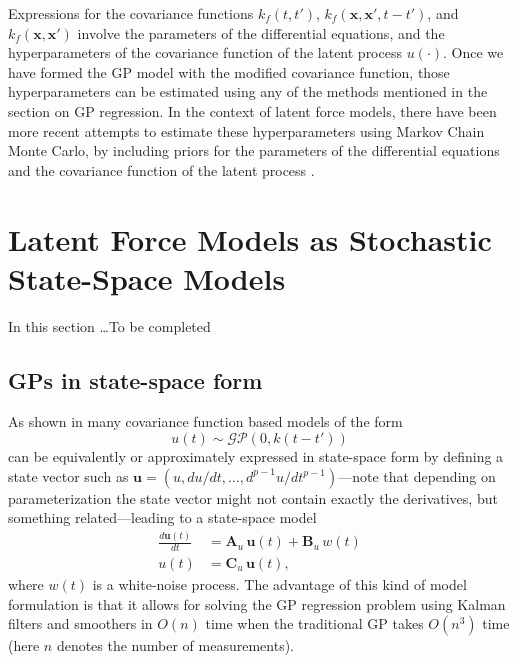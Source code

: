 \documentclass[journal]{IEEEtran}
\newcommand{\simo}[1]{{\color{red}#1}}
\begin{document}

Expressions for the covariance functions $k_{f}(t,t')$,
$k_{f}(\mathbf{x}, \mathbf{x}', t-t')$, and $k_{f}(\mathbf{x}, \mathbf{x}')$ involve the parameters of the differential equations, and the hyperparameters of the covariance function of the latent process $u(\cdot)$. Once we have formed the GP model with the modified covariance function, those hyperparameters can be estimated using any of the methods mentioned in the section on GP regression. In the context of latent force models, there have been more recent
attempts to estimate these hyperparameters using Markov Chain Monte Carlo, by including priors for the parameters of the differential equations and the covariance function of the latent process \cite{Titsias:control:vars:2009, Titsias:BMC:2012}.



\section{Latent Force Models as Stochastic State-Space Models}

In this section \ldots \simo{To be completed}

\subsection{GPs in state-space form}
As shown in \cite{Hartikainen+Sarkka:2010,Sarkka+Solin+Hartikainen:2013,Sarkka+Piche:2014} many covariance function based models of the form
%
\begin{equation}
  u(t) \sim \mathcal{GP}(0,k(t - t'))
\end{equation}
%
can be equivalently or approximately expressed in state-space form by defining a state vector such as $\mathbf{u} = (u, du/dt,\ldots,d^{p-1}u/dt^{p-1})$---note that depending on parameterization the state vector might not contain exactly the derivatives, but something related---leading to a state-space model
%
\begin{equation}
\begin{split}
  \frac{d\mathbf{u}(t)}{dt}
  &= \mathbf{A}_u \, \mathbf{u}(t) + \mathbf{B}_u \, w(t) \\
  u(t) &= \mathbf{C}_u \, \mathbf{u}(t),
\end{split}
\label{eq:ssu}
\end{equation}
%
where $w(t)$ is a white-noise process. The advantage of this kind of model formulation is that it allows for solving the GP regression problem using Kalman filters and smoothers \cite{Sarkka:2013} in $O(n)$ time when the traditional GP takes $O(n^3)$ time (here $n$ denotes the number of measurements).
\end{document}
